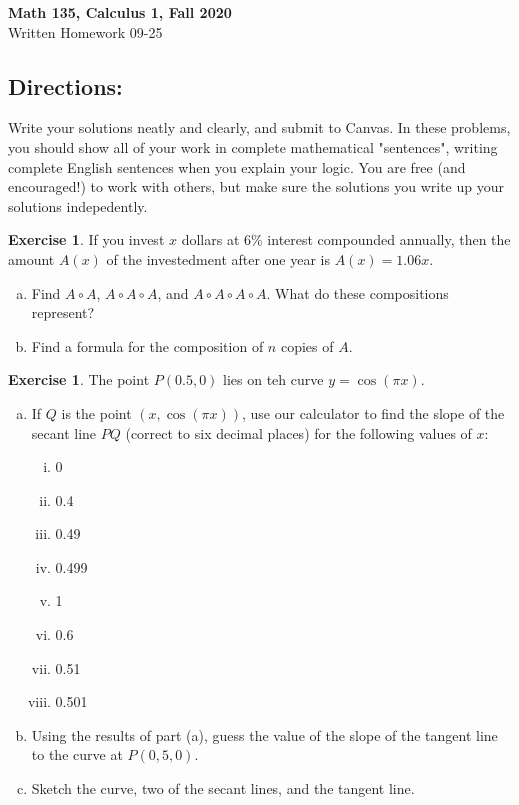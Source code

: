 \documentclass[11pt,reqno,final]{amsart}
\numberwithin{equation}{section}
\numberwithin{figure}{section}
\theoremstyle{definition} %
\newtheorem{exercise}[question]{Exercise}
\begin{document}
\begin{center}
        \textbf{\Large Math 135, Calculus 1, Fall 2020}\\[10pt]
        {\large Written Homework 09-25}
\end{center}

\thispagestyle{empty}

\renewcommand{\thesection}{\Alph{section}}

\subsection*{Directions:}
Write your solutions neatly and clearly, and submit to Canvas.
In these problems, you should show all of your work in complete mathematical "sentences", writing complete English sentences when you explain your logic.
You are free (and encouraged!) to work with others, but make sure the solutions you write up your solutions indepedently.

\begin{exercise}
        If you invest $x$ dollars at 6\% interest compounded annually, then the amount $A(x)$ of the investedment after one year is $A(x) = 1.06x$.
        \begin{enumerate}[(a)]
        \item Find $A \circ A$, $A \circ A \circ A$, and $A \circ A \circ A \circ A$. What do these compositions represent?
        \item Find a formula for the composition of $n$ copies of $A$.
        \end{enumerate}
\end{exercise}

\begin{exercise}
        The point $P(0.5,0)$ lies on teh curve $y = \cos(\pi x)$.
        \begin{enumerate}[(a)]
        \item If $Q$ is the point $(x, \cos(\pi x))$, use our calculator to find the slope of the secant line $PQ$ (correct to six decimal places) for the following values of $x$:
                \begin{enumerate}[i.]
                \item 0
                \item 0.4
                \item 0.49
                \item 0.499
                \item 1
                \item 0.6
                \item 0.51
                \item 0.501
                \end{enumerate}
        \item Using the results of part (a), guess the value of the slope of the tangent line to the curve at $P(0,5,0)$.
        \item Sketch the curve, two of the secant lines, and the tangent line.
        \end{enumerate}
\end{exercise}
\end{document}
